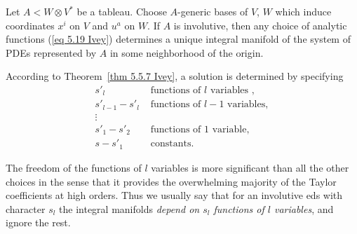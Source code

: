 \begin{thm}\label{thm 5.5.7 Ivey}
    Let $A<W\otimes V^\ast$ be a tableau. Choose $A$-generic bases of $V$, $W$ which induce coordinates $x^i$ on $V$ and $u^a$ on $W$. If $A$ is involutive, then any choice of analytic functions (\ref{eq 5.19 Ivey}) determines a unique integral manifold of the system of PDEs represented by $A$ in some neighborhood of the origin.
\end{thm}

According to Theorem~\ref{thm 5.5.7 Ivey}, a solution is determined by specifying 
\begin{align*}
    s'_l &\text{ functions of }l\text{ variables },\\
    s'_{l-1}-s'_l& \text{ functions of }l-1\text{ variables},\\
    \vdots &\\
    s'_1-s'_2&  \text{ functions of }1\text{ variable},\\
    s-s'_1 & \text{ constants.}
\end{align*}

The freedom of the functions of $l$ variables is more significant than all the other choices in the sense that it provides the overwhelming majority of the Taylor coefficients at high orders. Thus we usually say that for an involutive \gls{eds} with character $s_l$ the integral manifolds \emph{depend on $s_l$ functions of $l$ variables}, and ignore the rest.


